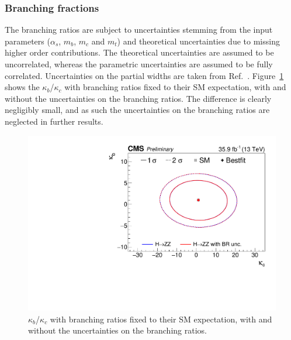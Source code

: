 
\subsubsection{Branching fractions}

The branching ratios are subject to uncertainties stemming from the input parameters ($\alpha_s$, $m_b$, $m_c$ and $m_t$) and theoretical uncertainties due to missing higher order contributions.
% 
The theoretical uncertainties are assumed to be uncorrelated, whereas the parametric uncertainties are assumed to be fully correlated.
% 
Uncertainties on the partial widths are taken from Ref.~\cite{deFlorian:2016spz}.
% 
Figure~\ref{fig:scans_kappatkappag_brcomparison} shows the $\kappa_b$/$\kappa_c$ with branching ratios fixed to their SM expectation, with and without the uncertainties on the branching ratios.
% 
The difference is clearly negligibly small, and as such the uncertainties on the branching ratios are neglected in further results.


\begin{figure}[hbtp]
  \begin{center}
    \includegraphics[width=\halflinewidth]{img/interpretation/other/multicont_Yukawa_compareBRuncertainties_asimov.pdf}
    \caption{
        $\kappa_b$/$\kappa_c$ with branching ratios fixed to their SM expectation, with and without the uncertainties on the branching ratios.
        }
    \label{fig:scans_kappatkappag_brcomparison}
  \end{center}
\end{figure}

